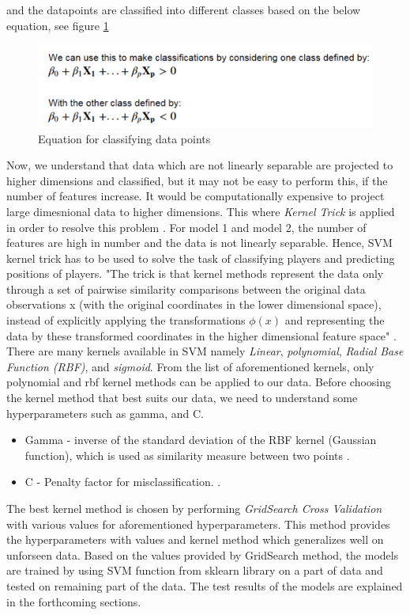 \documentclass[format=sigconf]{acmart}
\begin{document}
and the datapoints are classified into different classes based on the below equation, see figure \ref{fig:classification}
\begin{figure}[H]
    \centering
    \includegraphics[scale=0.40]{images/dimension_equation_for_classification.png}
    \caption{Equation for classifying data points}
    \label{fig:classification}
\end{figure}
Now, we understand that data which are not linearly separable are projected to higher dimensions and classified, but it may not be 
easy to perform this, if the number of features increase. It would be computationally expensive to project large dimesnional data
to higher dimensions. This where \textit{Kernel Trick} is applied in order to resolve this problem \cite{kernel}. For model 1 and 
model 2, the number of features are high in number and the data is not linearly separable. Hence, SVM kernel trick has to be used
to solve the task of classifying players and predicting positions of players. "The trick is that kernel methods represent the data 
only through a set of pairwise similarity comparisons between the original data observations x (with the original coordinates in the 
lower dimensional space), instead of explicitly applying the transformations $\phi(x)$ and representing the data by these 
transformed coordinates in the higher dimensional feature space" \cite{kernel}. There are many kernels available in SVM namely
\textit{Linear}, \textit{polynomial}, \textit{Radial Base Function (RBF)}, and \textit{sigmoid}. From the list of aforementioned kernels, only polynomial
and rbf kernel methods can be applied to our data. Before choosing the kernel method that best suits our data, we need to understand
some hyperparameters such as gamma, and C.
\begin{itemize}
    \item Gamma - inverse of the standard deviation of the RBF kernel (Gaussian function), which is used as similarity measure between two points
    \cite{scikitlearn}.
    \item C - Penalty factor for misclassification. \cite{scikitlearn}.
\end{itemize}
The best kernel method is chosen by performing \textit{GridSearch Cross Validation} with various values for aforementioned hyperparameters.
This method provides the hyperparameters with values and kernel method which generalizes well on unforseen data. Based on the 
values provided by GridSearch method, the models are trained by using SVM function from sklearn library on a part of data and tested 
on remaining part of the data. The test results of the models are explained in the forthcoming sections.
\end{document}
